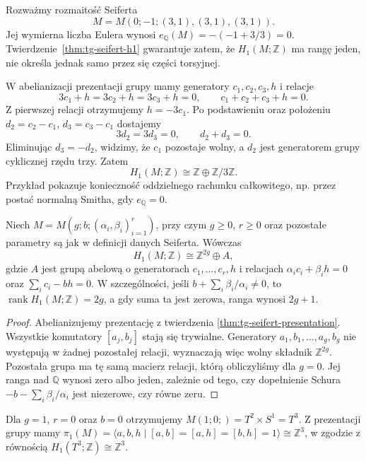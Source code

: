 \begin{przyklad}
\label{ex:tg-seifert-zero-e-torsion}
Rozważmy rozmaitość Seiferta
\[
M=M(0;-1;(3,1),(3,1),(3,1)).
\]
Jej wymierna liczba Eulera wynosi
$e_{\mathbb Q}(M)=-(-1+3/3)=0$.
Twierdzenie~\ref{thm:tg-seifert-h1}
gwarantuje zatem, że $H_1(M;\mathbb Z)$
ma rangę jeden, nie określa jednak samo
przez się części torsyjnej.

W abelianizacji prezentacji grupy mamy
generatory $c_1,c_2,c_3,h$ i relacje
\[
3c_1+h=3c_2+h=3c_3+h=0,
\qquad c_1+c_2+c_3+h=0.
\]
Z pierwszej relacji otrzymujemy $h=-3c_1$.
Po podstawieniu oraz położeniu
$d_2=c_2-c_1$, $d_3=c_3-c_1$
dostajemy
\[
3d_2=3d_3=0,\qquad d_2+d_3=0.
\]
Eliminując $d_3=-d_2$, widzimy, że
$c_1$ pozostaje wolny, a $d_2$
jest generatorem grupy cyklicznej rzędu
trzy. Zatem
\[
H_1(M;\mathbb Z)\cong
\mathbb Z\oplus\mathbb Z/3\mathbb Z.
\]
Przykład pokazuje konieczność oddzielnego
rachunku całkowitego, np. przez postać normalną
Smitha, gdy $e_{\mathbb Q}=0$.
\end{przyklad}

\begin{wniosek}
\label{cor:tg-seifert-general-h1}
Niech $M=M(g;b;(\alpha_i,\beta_i)_{i=1}^r)$, przy czym
$g\geq0$, $r\geq0$ oraz pozostałe parametry są jak
w definicji danych Seiferta. Wówczas
\[
H_1(M;\mathbb Z)\cong\mathbb Z^{2g}\oplus A,
\]
gdzie $A$ jest grupą abelową o generatorach
$c_1,\ldots,c_r,h$ i relacjach
$\alpha_i c_i+\beta_i h=0$ oraz
$\sum_i c_i-bh=0$.
W szczególności, jeśli $b+\sum_i\beta_i/\alpha_i\ne0$,
to $\operatorname{rank}H_1(M;\mathbb Z)=2g$,
a gdy suma ta jest zerowa, ranga wynosi $2g+1$.
\end{wniosek}
\begin{proof}
Abelianizujemy prezentację z twierdzenia
\ref{thm:tg-seifert-presentation}. Wszystkie komutatory
$[a_j,b_j]$ stają się trywialne. Generatory
$a_1,b_1,\ldots,a_g,b_g$ nie występują w żadnej
pozostałej relacji, wyznaczają więc wolny składnik
$\mathbb Z^{2g}$. Pozostała grupa ma tę samą macierz
relacji, którą obliczyliśmy dla $g=0$.
Jej ranga nad $\mathbb Q$ wynosi zero albo jeden,
zależnie od tego, czy dopełnienie Schura
$-b-\sum_i\beta_i/\alpha_i$ jest niezerowe,
czy równe zeru.
\end{proof}

\begin{przyklad}
Dla $g=1$, $r=0$ oraz $b=0$ otrzymujemy
$M(1;0;)=T^2\times S^1=T^3$. Z prezentacji grupy
mamy $\pi_1(M)=\langle a,b,h\mid [a,b]=[a,h]=[b,h]=1\rangle
\cong\mathbb Z^3$, w zgodzie z równością
$H_1(T^3;\mathbb Z)\cong\mathbb Z^3$.
\end{przyklad}

